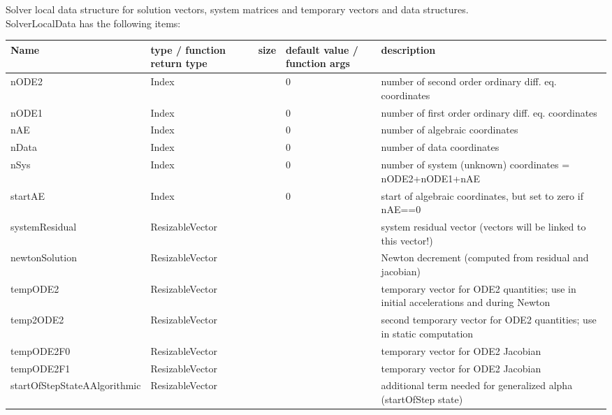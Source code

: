  \label{sec_SolverLocalData}
Solver local data structure for solution vectors, system matrices and temporary vectors and data structures.\\ 
%
SolverLocalData has the following items:
\begin{center}
  \footnotesize
  \begin{longtable}{| p{4.2cm} | p{2.5cm} | p{0.3cm} | p{3.0cm} | p{6cm} |}
    \hline
    \bf Name & \bf type / function return type & \bf size & \bf default value / function args & \bf description \\ \hline
    nODE2 &     Index &      &     0 &     number of second order ordinary diff. eq. coordinates\\ \hline
    nODE1 &     Index &      &     0 &     number of first order ordinary diff. eq. coordinates\\ \hline
    nAE &     Index &      &     0 &     number of algebraic coordinates\\ \hline
    nData &     Index &      &     0 &     number of data coordinates\\ \hline
    nSys &     Index &      &     0 &     number of system (unknown) coordinates = nODE2+nODE1+nAE\\ \hline
    startAE &     Index &      &     0 &     start of algebraic coordinates, but set to zero if nAE==0\\ \hline
    systemResidual &     ResizableVector &      &      &     system residual vector (vectors will be linked to this vector!)\\ \hline
    newtonSolution &     ResizableVector &      &      &     Newton decrement (computed from residual and jacobian)\\ \hline
    tempODE2 &     ResizableVector &      &      &     temporary vector for ODE2 quantities; use in initial accelerations and during Newton\\ \hline
    temp2ODE2 &     ResizableVector &      &      &     second temporary vector for ODE2 quantities; use in static computation\\ \hline
    tempODE2F0 &     ResizableVector &      &      &     temporary vector for ODE2 Jacobian\\ \hline
    tempODE2F1 &     ResizableVector &      &      &     temporary vector for ODE2 Jacobian\\ \hline
    startOfStepStateAAlgorithmic &     ResizableVector &      &      &     additional term needed for generalized alpha (startOfStep state)\\ \hline

\end{longtable}
\end{center}
